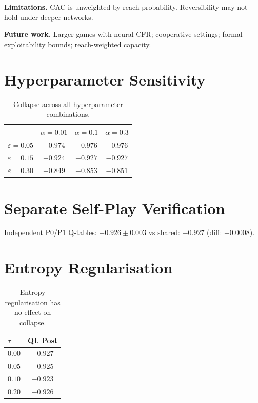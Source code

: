 \documentclass[sigconf,anonymous]{acmart}
\begin{document}
\textbf{Limitations.} CAC is unweighted by reach probability. Reversibility may not hold under deeper networks.

\textbf{Future work.} Larger games with neural CFR; cooperative settings; formal exploitability bounds; reach-weighted capacity.

\balance



\clearpage
\appendix

\section{Hyperparameter Sensitivity}
\label{app:hyperparam}

\begin{table}[h]
\centering
\begin{tabular}{lccc}
\toprule
& $\alpha\!=\!0.01$ & $\alpha\!=\!0.1$ & $\alpha\!=\!0.3$ \\
\midrule
$\varepsilon\!=\!0.05$ & $-0.974$ & $-0.976$ & $-0.976$ \\
$\varepsilon\!=\!0.15$ & $-0.924$ & $-0.927$ & $-0.927$ \\
$\varepsilon\!=\!0.30$ & $-0.849$ & $-0.853$ & $-0.851$ \\
\bottomrule
\end{tabular}
\caption{Collapse across all hyperparameter combinations.}
\end{table}

\section{Separate Self-Play Verification}
\label{app:separate}
Independent P0/P1 Q-tables: $-0.926\pm0.003$ vs shared: $-0.927$ (diff: $+0.0008$).

\section{Entropy Regularisation}
\label{app:entropy}

\begin{table}[h]
\centering
\begin{tabular}{lc}
\toprule
$\tau$ & QL Post \\
\midrule
$0.00$ & $-0.927$ \\
$0.05$ & $-0.925$ \\
$0.10$ & $-0.923$ \\
$0.20$ & $-0.926$ \\
\bottomrule
\end{tabular}
\caption{Entropy regularisation has no effect on collapse.}
\end{table}
\end{document}
